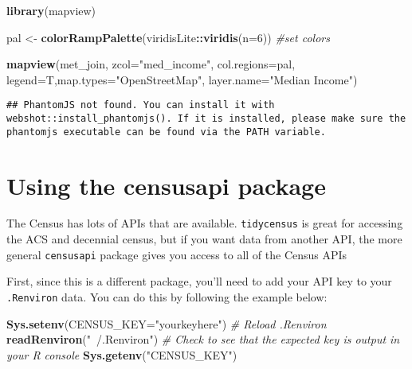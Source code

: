 \documentclass[]{article}
\newenvironment{Shaded}{\begin{snugshade}}{\end{snugshade}}
\newcommand{\KeywordTok}[1]{\textcolor[rgb]{0.13,0.29,0.53}{\textbf{#1}}}
\newcommand{\DataTypeTok}[1]{\textcolor[rgb]{0.13,0.29,0.53}{#1}}
\newcommand{\DecValTok}[1]{\textcolor[rgb]{0.00,0.00,0.81}{#1}}
\newcommand{\StringTok}[1]{\textcolor[rgb]{0.31,0.60,0.02}{#1}}
\newcommand{\CommentTok}[1]{\textcolor[rgb]{0.56,0.35,0.01}{\textit{#1}}}
\newcommand{\OperatorTok}[1]{\textcolor[rgb]{0.81,0.36,0.00}{\textbf{#1}}}
\newcommand{\NormalTok}[1]{#1}
\begin{document}
\begin{Shaded}
\begin{Highlighting}[]
\KeywordTok{library}\NormalTok{(mapview)}

\NormalTok{pal <-}\StringTok{ }\KeywordTok{colorRampPalette}\NormalTok{(viridisLite}\OperatorTok{::}\KeywordTok{viridis}\NormalTok{(}\DataTypeTok{n=}\DecValTok{6}\NormalTok{)) }\CommentTok{#set colors}

\KeywordTok{mapview}\NormalTok{(met_join, }\DataTypeTok{zcol=}\StringTok{"med_income"}\NormalTok{, }\DataTypeTok{col.regions=}\NormalTok{pal, }\DataTypeTok{legend=}\NormalTok{T,}\DataTypeTok{map.types=}\StringTok{"OpenStreetMap"}\NormalTok{, }\DataTypeTok{layer.name=}\StringTok{"Median Income"}\NormalTok{)}
\end{Highlighting}
\end{Shaded}

\begin{verbatim}
## PhantomJS not found. You can install it with webshot::install_phantomjs(). If it is installed, please make sure the phantomjs executable can be found via the PATH variable.
\end{verbatim}

\hypertarget{htmlwidget-e8faa941690678c3ca3f}{}

\newpage

\section{Using the censusapi package}\label{using-the-censusapi-package}

The Census has lots of APIs that are available. \texttt{tidycensus} is
great for accessing the ACS and decennial census, but if you want data
from another API, the more general \texttt{censusapi} package gives you
access to all of the Census APIs

First, since this is a different package, you'll need to add your API
key to your \texttt{.Renviron} data. You can do this by following the
example below:

\begin{Shaded}
\begin{Highlighting}[]
\KeywordTok{Sys.setenv}\NormalTok{(}\DataTypeTok{CENSUS_KEY=}\StringTok{"yourkeyhere"}\NormalTok{)}
\CommentTok{# Reload .Renviron}
\KeywordTok{readRenviron}\NormalTok{(}\StringTok{"~/.Renviron"}\NormalTok{)}
\CommentTok{# Check to see that the expected key is output in your R console}
\KeywordTok{Sys.getenv}\NormalTok{(}\StringTok{"CENSUS_KEY"}\NormalTok{)}
\end{Highlighting}
\end{Shaded}
\end{document}
